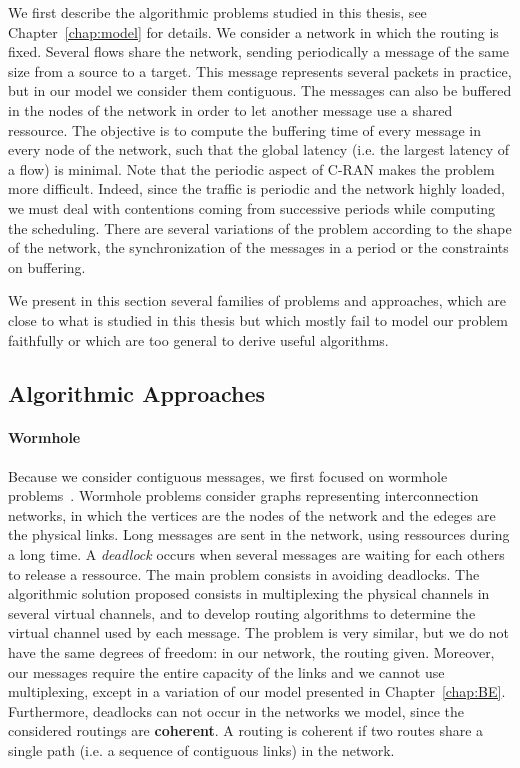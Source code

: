  We first describe the algorithmic problems studied in this thesis, see Chapter~\ref{chap:model} for details. We consider a network in which the routing is fixed. Several flows share the network, sending periodically a message of the same size from a source to a target. This message represents several packets in practice, but in our model we consider them contiguous. The messages can also be buffered in the nodes of the network in order to let another message use a shared ressource. The objective is to compute the buffering time of every message in every node of the network, such that the global latency (i.e. the largest latency of a flow) is minimal. Note that the periodic aspect of C-RAN makes the problem more difficult. Indeed, since the traffic is periodic and the network highly loaded, we must deal with contentions coming from successive periods while computing the scheduling. There are several variations of the problem according to the shape of the network, the synchronization of the messages in a period or the constraints on buffering.
 
 We present in this section several families of problems and approaches, which are close to what is studied in this thesis but which mostly fail to model our problem faithfully or which are too general to derive useful algorithms.


\subsection{Algorithmic Approaches}

\paragraph{Wormhole}

Because we consider contiguous messages, we first focused on wormhole problems~\cite{ni1993survey,cole1996benefit}. Wormhole problems consider graphs representing interconnection networks, in which the vertices are the nodes of the network and the edeges are the physical links. Long messages are sent in the network, using ressources during a long time. A \emph{deadlock} occurs when several messages are waiting for each others to release a ressource. The main problem consists in avoiding deadlocks. The algorithmic solution proposed consists in multiplexing the physical channels in several virtual channels, and to develop routing algorithms to determine the virtual channel used by each message. 
The problem is very similar, but we do not have the same degrees of freedom: in our network, the routing given. Moreover, our messages require the entire capacity of the links and we cannot use multiplexing, except in a variation of our model presented in Chapter~\ref{chap:BE}. Furthermore, deadlocks can not occur in the networks we model, since the considered routings are \textbf{coherent}\cite{Schwiebert1996ANA}. A routing is coherent if two routes share a single path (i.e. a sequence of contiguous links) in the network.

